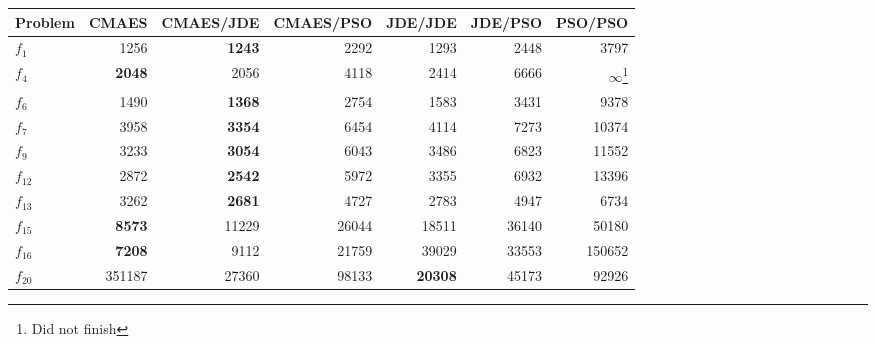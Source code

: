 \begin{table*}
    \begin{tabular}{|l|r|r|r|r|r|r|}
    \hline
    Problem &  CMAES &  CMAES/JDE &  CMAES/PSO &  JDE/JDE &  JDE/PSO & PSO/PSO \\\hline
    $f_{1}$   &         1256 &       \textbf{1243} &       2292 &     1293 &     2448 &  3797 \\\hline
    $f_{4}$   &         \textbf{2048} &       2056 &       4118 &     2414 &     6666 &  $\infty$\footnote{Did not finish} \\\hline
    $f_{6}$   &         1490 &       \textbf{1368} &       2754 &     1583 &     3431 &  9378 \\\hline
    $f_{7}$   &         3958 &       \textbf{3354} &       6454 &     4114 &     7273 &  10374 \\\hline
    $f_{9}$   &         3233 &       \textbf{3054} &       6043 &     3486 &     6823 &  11552 \\\hline
    $f_{12}$  &         2872 &       \textbf{2542} &       5972 &     3355 &     6932 &  13396 \\\hline
    $f_{13}$  &         3262 &       \textbf{2681} &       4727 &     2783 &     4947 &  6734 \\\hline
    $f_{15}$  &         \textbf{8573} &      11229 &      26044 &    18511 &    36140 &  50180 \\\hline
    $f_{16}$  &         \textbf{7208} &       9112 &      21759 &    39029 &    33553 &  150652 \\\hline
    $f_{20}$  &       351187 &      27360 &      98133 &    \textbf{20308} &    45173 &  92926 \\\hline
    \end{tabular}
\end{table*}
